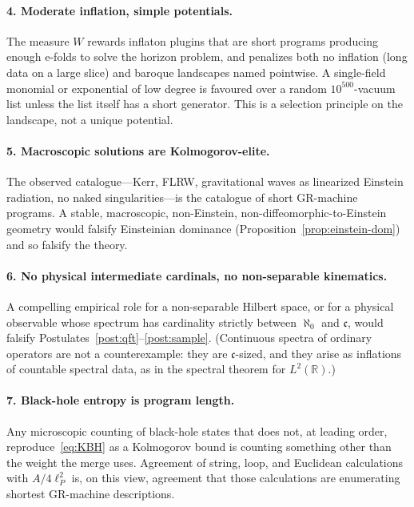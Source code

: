 \documentclass[11pt,a4paper]{article}
\theoremstyle{plain}
\theoremstyle{definition}
\theoremstyle{remark}
\newcommand{\R}{\mathbb{R}}
\newcommand{\alef}{\aleph_{0}}
\newcommand{\cont}{\mathfrak{c}}
\begin{document}
\paragraph{4. Moderate inflation, simple potentials.}
The measure $W$ rewards inflaton plugins that are short programs producing enough e-folds to solve the horizon problem, and penalizes both no inflation (long data on a large slice) and baroque landscapes named pointwise.
A single-field monomial or exponential of low degree is favoured over a random $10^{500}$-vacuum list unless the list itself has a short generator.
This is a selection principle on the landscape, not a unique potential.

\paragraph{5. Macroscopic solutions are Kolmogorov-elite.}
The observed catalogue---Kerr, FLRW, gravitational waves as linearized Einstein radiation, no naked singularities---is the catalogue of short GR-machine programs.
A stable, macroscopic, non-Einstein, non-diffeomorphic-to-Einstein geometry would falsify Einsteinian dominance (Proposition~\ref{prop:einstein-dom}) and so falsify the theory.

\paragraph{6. No physical intermediate cardinals, no non-separable kinematics.}
A compelling empirical role for a non-separable Hilbert space, or for a physical observable whose spectrum has cardinality strictly between $\alef$ and $\cont$, would falsify Postulates~\ref{post:qft}--\ref{post:sample}.
(Continuous spectra of ordinary operators are not a counterexample: they are $\cont$-sized, and they arise as inflations of countable spectral data, as in the spectral theorem for $L^{2}(\R)$.)

\paragraph{7. Black-hole entropy is program length.}
Any microscopic counting of black-hole states that does not, at leading order, reproduce~\eqref{eq:KBH} as a Kolmogorov bound is counting something other than the weight the merge uses.
Agreement of string, loop, and Euclidean calculations with $A/4\ell_{P}^{2}$ is, on this view, agreement that those calculations are enumerating shortest GR-machine descriptions.
\end{document}
